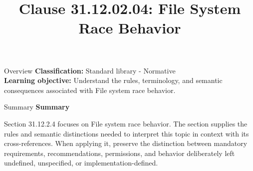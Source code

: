 \documentclass[10pt,letterpaper]{article}
\title{Clause 31.12.02.04: File System Race Behavior}
\author{}
\date{}
\begin{document}
\maketitle
\begin{CornellOverviewBox}{Overview}
\textbf{Classification:} Standard library - Normative\\[2pt]
\textbf{Learning objective:} Understand the rules, terminology, and semantic consequences associated with File system race behavior.
\end{CornellOverviewBox}\begin{CornellSummaryBox}{Summary}
{\sffamily\bfseries\color{Accent} Summary}\par\vspace{3pt}Section 31.12.2.4 focuses on File system race behavior. The section supplies the rules and semantic distinctions needed to interpret this topic in context with its cross-references. When applying it, preserve the distinction between mandatory requirements, recommendations, permissions, and behavior deliberately left undefined, unspecified, or implementation-defined.
\end{CornellSummaryBox}
\end{document}

